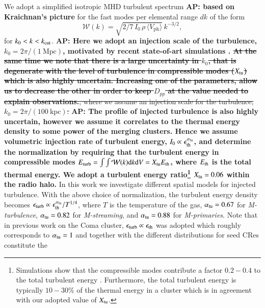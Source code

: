 \documentclass[a4paper,fleqn,usenatbib]{mnras}
\newcommand{\Mstream}{{\it M-streaming}\xspace}
\newcommand{\Mflatturb}{{\it M-turbulence}\xspace}
\newcommand{\Mprimary}{{\it M-primaries}\xspace}
\newcommand{\Vph}{V_\mathrm{ph}}
\def\AP#1{{\bf  AP: #1}}
\begin{document}
We adopt a simplified isotropic MHD turbulent spectrum \AP{based on
Kraichnan's picture} for the fast modes per elemental range $dk$ of
  the form
\begin{equation}
  \label{eq:Wk}
  \mathcal{W}(k) =
\sqrt{2/7\,I_0\,\rho\,\langle \Vph \rangle}\,k^{-3/2},
\end{equation}
for $k_0<k<k_{\mathrm{cut}}$. \AP{Here we adopt an injection scale of the
  turbulence, $k_0= 2\pi/(1~\mbox{Mpc})$, motivated by recent
  state-of-art simulations
  \citep{2009A&A...504...33V,2011A&A...529A..17V,2015ApJ...800...60M}. \sout{At
    the same time we note that there is a large uncertainty in $k_0$,
    that is degenerate with the level of turbulence in compressible
    modes ($X_{\mathrm{tu}}$) which is also highly uncertain. Increasing
    one of the parameters, allow us to decrease the other in order to
    keep $D_{pp}$ at the value needed to explain
    observations.}}\sout{, where we assume an injection scale for the
  turbulence, $k_0= 2\pi/(100~\mbox{kpc})$.} \AP{The profile of
  injected turbulence is also highly uncertain, however we assume it
  correlates to the thermal energy density to some power of the
  merging clusters. Hence we assume volumetric injection rate of
  turbulent energy, $I_0\propto \epsilon_{\mathrm{th}}^{\alpha_{\mathrm{tu}}}$,
  and determine the normalization by requiring that the turbulent
  energy in compressible modes $E_{\mathrm{turb}}=\int \int \mathcal{W}(k)
  {\mathrm{d}}k {\mathrm{d}}V = X_{\mathrm{tu}} E_{\mathrm{th}}$, where $E_{\mathrm{th}}$ is
  the total thermal energy. We adopt a turbulent energy
  ratio\footnote{Simulations show that the compressible modes
    contribute a factor $0.2-0.4$ to the total turbulent energy
    \citep{2013ApJ...771..131B,2015ApJ...800...60M}. Furthermore, the
    total turbulent energy is typically $10-30$\% of the thermal
    energy in a cluster which is in agreement with our adopted value
    of $X_{\mathrm{tu}}$.}  $X_{\mathrm{tu}}=0.06$ within the radio halo.} In
this work we investigate different spatial models for injected
turbulence. With the above choice of normalization, the turbulent
energy density becomes $\epsilon_{\mathrm{turb}} \propto
\epsilon_{\mathrm{th}}^{\alpha_{\mathrm{tu}}}/T^{1/4}$, where $T$ is the
temperature of the gas, $\alpha_{\mathrm{tu}}= 0.67$ for \Mflatturb,
$\alpha_{\mathrm{tu}}= 0.82$ for \Mstream, and $\alpha_{\mathrm{tu}}= 0.88$ for
\Mprimary. Note that in previous work on the Coma cluster,
$\epsilon_{\mathrm{turb}} \propto \epsilon_{\mathrm{th}}$ was adopted which
roughly corresponds to $\alpha_{\mathrm{tu}}= 1$ \citep{brunetti12} and
together with the different distributions for seed CRes constitute the
\end{document}
